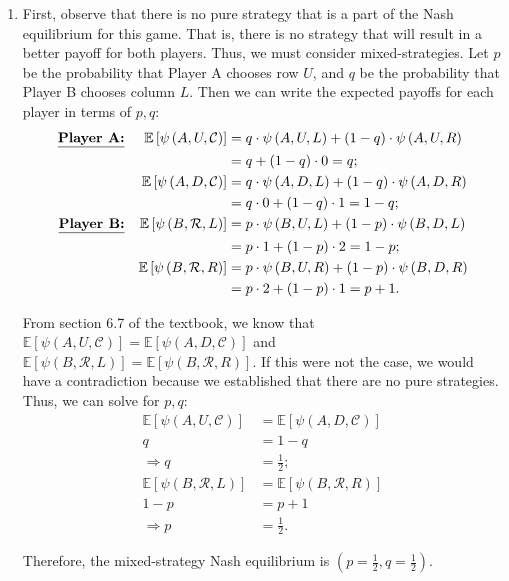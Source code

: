 \documentclass{article}
\newcommand{\pay}[3]{\psi\left(#1,#2,#3\right)}
\newcommand{\expp}[1]{\mathbb{E}\left[ #1 \right]}
\begin{document}
\begin{enumerate}
\begin{enumerate}
        \item First, observe that there is no pure strategy that is a part of the Nash equilibrium for this game. That is, there is no strategy that will result in a better payoff for both players. Thus, we must consider mixed-strategies. Let $p$ be the probability that Player A chooses row $U$, and $q$ be the probability that Player B chooses column $L$. Then we can write the expected payoffs for each player in terms of $p,q$:
        \begin{align*}
            \textbf{\underline{Player A:}} && \expp{\pay{A}{U}{\mathcal{C}}} & =q\cdot\pay{A}{U}{L} + (1-q)\cdot\pay{A}{U}{R} \\
            &&& =q+(1-q)\cdot0=q; \\
            && \expp{\pay{A}{D}{\mathcal{C}}} & =q\cdot\pay{A}{D}{L} + (1-q)\cdot\pay{A}{D}{R} \\
            &&& =q\cdot0+(1-q)\cdot1=1-q; \\
            \textbf{\underline{Player B:}} && \expp{\pay{B}{\mathcal{R}}{L}} & =p\cdot\pay{B}{U}{L} + (1-p)\cdot\pay{B}{D}{L} \\\
            &&& =p\cdot1+(1-p)\cdot2=1-p; \\
            && \expp{\pay{B}{\mathcal{R}}{R}} & =p\cdot\pay{B}{U}{R} + (1-p)\cdot\pay{B}{D}{R} \\
            &&& =p\cdot2+(1-p)\cdot1=p+1.
        \end{align*}

        From section 6.7 of the textbook, we know that $\expp{\pay{A}{U}{\mathcal{C}}}=\expp{\pay{A}{D}{\mathcal{C}}}$ and $\expp{\pay{B}{\mathcal{R}}{L}}=\expp{\pay{B}{\mathcal{R}}{R}}$. If this were not the case, we would have a contradiction because we established that there are no pure strategies. Thus, we can solve for $p,q$:
        \begin{align*}
            \expp{\pay{A}{U}{\mathcal{C}}} & =\expp{\pay{A}{D}{\mathcal{C}}} \\
            q & =1-q \\
            \Rightarrow q & =\frac{1}{2}; \\
            \expp{\pay{B}{\mathcal{R}}{L}} & =\expp{\pay{B}{\mathcal{R}}{R}} \\
            1-p & =p+1 \\
            \Rightarrow p & =\frac{1}{2}.
        \end{align*}

        Therefore, the mixed-strategy Nash equilibrium is $(p=\frac{1}{2},q=\frac{1}{2})$.
    \end{enumerate}


\end{enumerate}
\end{document}
